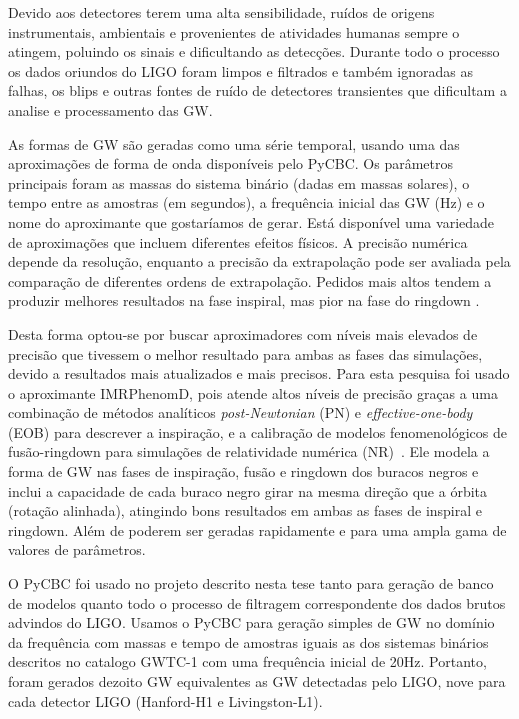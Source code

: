 Devido aos detectores terem uma alta sensibilidade, ruídos de origens instrumentais, ambientais e provenientes de atividades humanas sempre o atingem, poluindo os sinais e dificultando as detecções. Durante todo o processo os dados oriundos do LIGO foram limpos e filtrados e também ignoradas as falhas, os blips e outras fontes de ruído de detectores transientes que dificultam a analise e processamento das GW.

As formas de GW são geradas como uma série temporal, usando uma das aproximações de forma de onda disponíveis pelo PyCBC. Os parâmetros principais foram as massas do sistema binário (dadas em massas solares), o tempo entre as amostras (em segundos), a frequência inicial das GW (Hz) e o nome do aproximante que gostaríamos de gerar. Está disponível uma variedade de aproximações que incluem diferentes efeitos físicos. A precisão numérica depende da resolução, enquanto a precisão da extrapolação pode ser avaliada pela comparação de diferentes ordens de extrapolação. Pedidos mais altos tendem a produzir melhores resultados na fase inspiral, mas pior na fase do ringdown \cite{scharpf2017simulation}. 

Desta forma optou-se por buscar aproximadores com níveis mais elevados de precisão que tivessem o melhor resultado para ambas as fases das simulações, devido a resultados mais atualizados e mais precisos. Para esta pesquisa foi usado o aproximante IMRPhenomD, pois atende altos níveis de precisão graças a uma combinação de métodos analíticos \textit{post-Newtonian} (PN) e \textit{effective-one-body} (EOB) para descrever a inspiração, e a calibração de modelos fenomenológicos de fusão-ringdown para simulações de relatividade numérica (NR)~\cite{khan2015frequencydomain}. Ele modela a forma de GW nas fases de inspiração, fusão e ringdown dos buracos negros e inclui a capacidade de cada buraco negro girar na mesma direção que a órbita (rotação alinhada), atingindo bons resultados em ambas as fases de inspiral e ringdown. Além de poderem ser geradas rapidamente e para uma ampla gama de valores de parâmetros.

O PyCBC foi usado no projeto descrito nesta tese tanto para geração de banco de modelos quanto todo o processo de filtragem correspondente dos dados brutos advindos do LIGO. Usamos o PyCBC para geração simples de GW no domínio da frequência com massas e tempo de amostras iguais as dos sistemas binários descritos no catalogo GWTC-1 com uma frequência inicial de 20Hz. Portanto, foram gerados dezoito GW equivalentes as GW detectadas pelo LIGO, nove para cada detector LIGO (Hanford-H1 e Livingston-L1).

